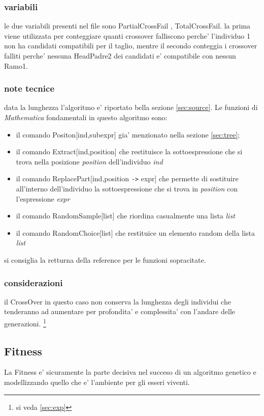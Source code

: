 \documentclass[12pt, a4paper]{article}
\begin{document}
\subsubsection{variabili}
le due variabili presenti nel file sono PartialCrossFail , TotalCrossFail. la prima viene utilizzata per conteggiare quanti crossover falliscono perche' l'individuo 1 non ha candidati compatibili per il taglio, mentre il secondo conteggia i crossover falliti perche' nessuna HeadPadre2 dei candidati e' compatibile con nessun Ramo1.

\subsubsection{note tecnice}
data la lunghezza l'algoritmo e' riportato bella sezione \ref{sec:source}.
Le funzioni di {\itshape Mathematica} fondamentali in questo algoritmo sono: 
\begin{itemize}
\item il comando Positon[ind,subexpr] gia' menzionato nella sezione \ref{sec:tree}; 
\item il comando Extract[ind,position] che restituisce la sottoespressione che si trova nella posizione {\itshape position} dell'individuo {\itshape ind}
\item il comando ReplacePart[ind,position \verb|->| expr] che permette di sostituire all'interno dell'individuo la sottoespressione che si trova in {\itshape position} con l'espressione {\itshape expr}
\item il comando RandomSample[list] che riordina casualmente una lista {\itshape list}
\item il comando RandomChoice[list] che restituice un elemento random della lista {\itshape list}
\end{itemize}

si consiglia la retturna della reference per le funzioni sopracitate. 

\subsubsection{considerazioni}
il CrossOver in questo caso non conserva la lunghezza degli individui che tenderanno ad aumentare per profondita' e complessita' con l'andare delle generazioni.
\footnote{si veda \ref{sec:exp}}


\subsection{Fitness}
\label{sec:fit}
La Fitness e' sicuramente la parte decisiva nel succeso di un algoritmo genetico e modellizzando quello che e' l'ambiente per gli esseri viventi.
\end{document}
